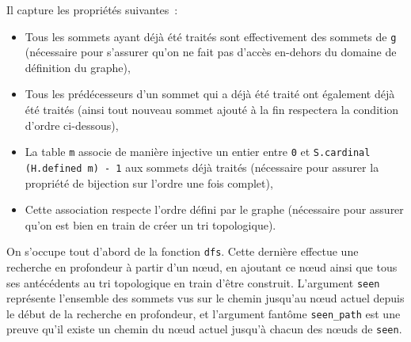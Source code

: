 \documentclass[a4paper,10pt]{article}
\begin{document}
Il capture les propriétés suivantes~:
\begin{itemize}
  \item{Tous les sommets ayant déjà été traités sont effectivement des sommets de \lstinline{g} (nécessaire pour s'assurer qu'on ne fait pas d'accès en-dehors du domaine de définition du graphe),}
  \item{Tous les prédécesseurs d'un sommet qui a déjà été traité ont également déjà été traités (ainsi tout nouveau sommet ajouté à la fin respectera la condition d'ordre ci-dessous),}
  \item{La table \lstinline{m} associe de manière injective un entier entre \lstinline{0} et \lstinline{S.cardinal (H.defined m) - 1} aux sommets déjà traités (nécessaire pour assurer la propriété de bijection sur l'ordre une fois complet),}
  \item{Cette association respecte l'ordre défini par le graphe (nécessaire pour assurer qu'on est bien en train de créer un tri topologique).}
\end{itemize}

On s'occupe tout d'abord de la fonction \lstinline{dfs}. Cette dernière effectue une recherche en profondeur à partir d'un nœud, en ajoutant ce nœud ainsi que tous ses antécédents au tri topologique en train d'être construit. L'argument \lstinline{seen} représente l'ensemble des sommets vus sur le chemin jusqu'au nœud actuel depuis le début de la recherche en profondeur, et l'argument fantôme \lstinline{seen_path} est une preuve qu'il existe un chemin du nœud actuel jusqu'à chacun des nœuds de \lstinline{seen}.
\end{document}
